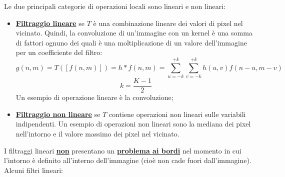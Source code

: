 \documentclass[a4paper]{article}
\begin{document}
	Le due principali categorie di operazioni locali sono lineari e non lineari:
	
	\begin{itemize}
		\item \textcolor{Red3}{\textbf{\underline{Filtraggio lineare}}} se $T$ è una combinazione lineare dei valori di pixel nel vicinato. Quindi, la convoluzione di un'immagine con un kernel è una somma di fattori ognuno dei quali è una moltiplicazione di un valore dell'immagine per un coefficiente del filtro:
		\begin{equation*}
			g\left(n,m\right) = T\left(\left[f\left(n,m\right)\right]\right) = h * f\left(n,m\right) = \sum_{u=-k}^{+k} \sum_{v=-k}^{+k} h\left(u,v\right) f\left(n-u, m-v\right)
		\end{equation*}
		\begin{equation*}
			k = \dfrac{K-1}{2}
		\end{equation*}
		Un esempio di operazione lineare è la convoluzione;
		
		\item \textcolor{Red3}{\textbf{\underline{Filtraggio non lineare}}} se $T$ contiene operazioni non lineari sulle variabili indipendenti. Un esempio di operazioni non lineari sono la mediana dei pixel nell'intorno e il valore massimo dei pixel nel vicinato.
	\end{itemize}

	\noindent
	I filtraggi lineari \textbf{\underline{non}} presentano un \textbf{\underline{problema ai bordi}} nel momento in cui l'intorno è definito all'interno dell'immagine (cioè non cade fuori dall'immagine). Alcuni filtri lineari:
	
\end{document}
